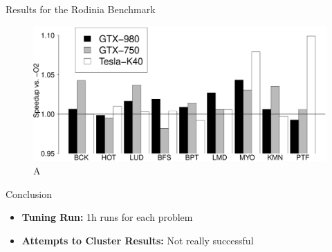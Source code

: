 \documentclass{beamer}
\begin{document}
\begin{frame}
\begin{columns}[t]
\begin{column}{.46\linewidth}
\begin{block}{\Large Results for the Rodinia Benchmark}
            \begin{figure}[htpb]
                \includegraphics[width=0.84\linewidth]{RodiniaSummary_small.eps}
                \caption{A}
            \end{figure}
        \end{block}
        \begin{block}{\Large Conclusion}
            \large
            \begin{itemize}
                \item \textbf{Tuning Run:} 1h runs for each problem
                \item \textbf{Attempts to Cluster Results:} Not really successful
            \end{itemize}
        \end{block}
    \end{column}
\end{columns}
\end{frame}
\end{document}
